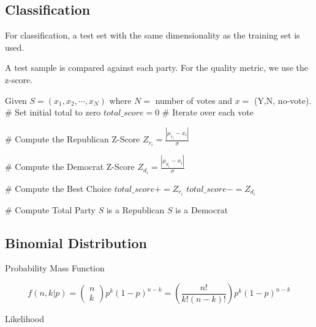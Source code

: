 \documentclass[12pt]{report}
\begin{document}
\clearpage
\subsection*{Classification}

For classification, a test set with the same dimensionality as the training set is used.

A test sample is compared against each party.  For the quality metric, we use the z-score.


\begin{algorithmic}
\State
\State Given $S = \left( x_1, x_2, \cdots, x_N \right)$ where $N = $ number of votes and $x = $ (Y,N, no-vote).
\State
\State \# Set initial total to zero
\State $total\_score = 0$
\State
\State \# Iterate over each vote
    
    \State
    \State \# Compute the Republican Z-Score
    \State $Z_{r_i} = \frac{\left|\mu_{r_i} - x_i\right|}{\sigma}$
    
    \State
    \State \# Compute the Democrat Z-Score
    \State $Z_{d_i} = \frac{\left|\mu_{d_i} - x_i\right|}{\sigma}$
    \State

    \State \# Compute the Best Choice
        \State $total\_score += Z_{r_i}$
    \Else
        \State $total\_score -= Z_{d_i}$
    \EndIf


\EndFor
\State
\State \# Compute Total Party
    \State $S$ is a Republican
\Else
    \State $S$ is a Democrat
\EndIf

\end{algorithmic}


\clearpage
\subsection*{Binomial Distribution}

Probability Mass Function


\begin{equation}
f(n,k | p) = \begin{pmatrix}
n\\k
\end{pmatrix} p^k (1-p)^{n-k} =\left( \frac{n!}{k!(n-k)!}\right) p^k (1-p)^{n-k}
\end{equation}


Likelihood
\end{document}
